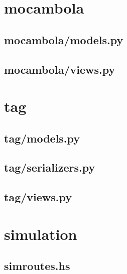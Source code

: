 \section{mocambola}

\subsection{mocambola/models.py}


%

\subsection{mocambola/views.py}




\section{tag}

\subsection{tag/models.py}


\subsection{tag/serializers.py}


\subsection{tag/views.py}


%

%


\section{simulation}

\subsection{simroutes.hs}

